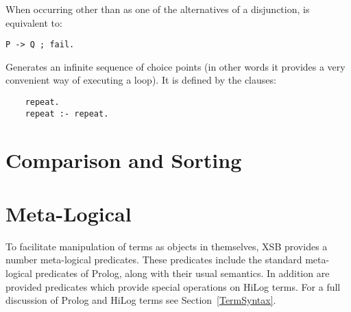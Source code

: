 \begin{description}
  
    When occurring other than as one of the alternatives of a disjunction,
    is equivalent to:
	\begin{center}
	{\tt P -> Q ; fail.}
	\end{center}

  
    Generates an infinite sequence of choice points (in other words it 
    provides a very convenient way of executing a loop). It is defined 
    by the clauses:
    \begin{center}
    \begin{minipage}{1.5in}
    \begin{verbatim}
	repeat.
	repeat :- repeat.
    \end{verbatim}
    \end{minipage}
    \end{center}

\end{description}

\section{Comparison and Sorting} \label{Comparison}


\section{Meta-Logical}\label{MetaLogical}

To facilitate manipulation of terms as objects in themselves,
XSB provides a number meta-logical predicates.  These
predicates include the standard meta-logical predicates of Prolog,
along with their usual semantics.  In addition are provided predicates
which provide special operations on HiLog terms.  For a full
discussion of Prolog and HiLog terms see Section~\ref{TermSyntax}.

